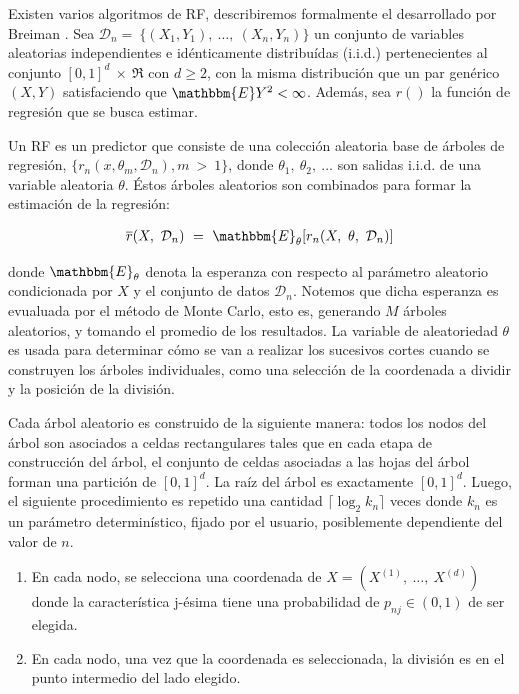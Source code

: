   \par Existen varios algoritmos de RF, describiremos formalmente el desarrollado
    por Breiman \cite{random_forest}.
    Sea $\mathcal{D}_{n} = \ \{ (X_{1}, Y_{1}), \ \dots, \ (X_{n}, Y_{n})\}$
    un conjunto de variables aleatorias independientes e idénticamente distribuídas (i.i.d.)
    pertenecientes al conjunto $[0,1]^{d} \ \times \ \Re $ con $d \geq 2$,
    con la misma distribución que un par genérico $(X,Y)$ satisfaciendo que
    $\mathbbm{E}Y^{2} < \infty$. Además, sea $r()$ la función de regresión que se busca estimar.

  \par Un RF es un predictor que consiste de una colección aleatoria base
    de árboles de regresión, $\{ r_{n}(x, \theta_{m}, \mathcal{D}_{n}), m \ > \ 1 \}$, donde
    $\theta_{1},\ \theta_{2},\ \dots$ son salidas i.i.d. de una variable aleatoria
    $\theta$. Éstos árboles aleatorios son combinados para formar la estimación
    de la regresión:

    \begin{align}
      \overline{r}(X,\ \mathcal{D}_{n})\ =\ \mathbbm{E}_{\theta}[r_{n}(X,\ \theta,\ \mathcal{D}_{n})]
    \end{align}

    donde $\mathbbm{E}_{\theta}$ denota la esperanza con respecto al parámetro aleatorio
    condicionada por $X$ y el conjunto de datos $\mathcal{D}_{n}$. Notemos que
    dicha esperanza es evualuada por el método de Monte Carlo\cite{monte_carlo},
    esto es, generando $M$ árboles aleatorios, y tomando el promedio de los resultados.
    La variable de aleatoriedad $\theta$ es usada para determinar cómo se van a realizar los
    sucesivos cortes cuando se construyen los árboles individuales, como una selección
    de la coordenada a dividir y la posición de la división.

  \par Cada árbol aleatorio es construido de la siguiente manera: todos los nodos
    del árbol son asociados a celdas rectangulares tales que en cada etapa de
    construcción del árbol, el conjunto de celdas asociadas a las hojas del árbol
    forman una partición de $[0, 1]^{d}$. La raíz del árbol es exactamente $[0, 1]^{d}$.
    Luego, el siguiente procedimiento es repetido una cantidad $\lceil \log_{2}k_{n} \rceil$ veces
    donde $k_{n}$ es un parámetro determinístico, fijado por el usuario, posiblemente
    dependiente del valor de $n$.

    \begin{enumerate}
      \item En cada nodo, se selecciona una coordenada de $X = (X^{(1)}, \ \dots,\ X^{(d)})$
            donde la característica j-ésima tiene una probabilidad de $p_{nj} \in (0,1)$
            de ser elegida.
      \item En cada nodo, una vez que la coordenada es seleccionada, la división es
            en el punto intermedio del lado elegido.
    \end{enumerate}

